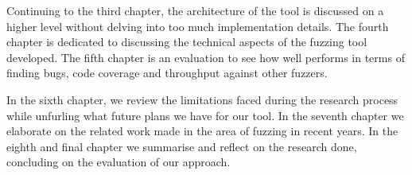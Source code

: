 Continuing to the third chapter, the architecture of the tool is discussed on a higher level without delving into too much implementation details. The fourth chapter is dedicated to discussing the technical aspects of the fuzzing tool developed. The fifth chapter is an evaluation to see how well \pname{} performs in terms of finding bugs, code coverage and throughput against other fuzzers. 

In the sixth chapter, we review the limitations faced during the research process while unfurling what future plans we have for our tool. In the seventh chapter we elaborate on the related work made in the area of fuzzing in recent years. In the eighth and final chapter we summarise and reflect on the research done, concluding on the evaluation of our approach.